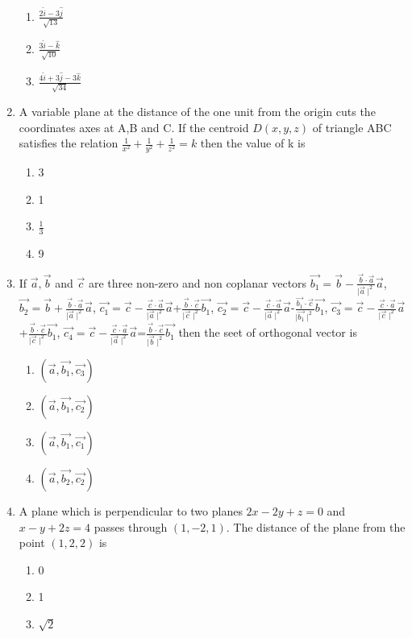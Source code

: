 \documentclass[12pt]{article}
\providecommand{\brak}[1]{\ensuremath{\left(#1\right)}}
\begin{document}
\begin{enumerate}
\begin{enumerate}
\item $\frac{2\hat{i}-3\hat{j}}{\sqrt{13}}$
\item $\frac{3\hat{i}-\hat{k}}{\sqrt{10}}$
\item $\frac{4\hat{i}+3\hat{j}-3\hat{k}}{\sqrt{34}}$
\end{enumerate}
\item A variable plane at the distance of the one unit from the origin cuts the coordinates axes at A,B and C. If the centroid $D\brak{x,y,z}$ of triangle ABC satisfies the relation $\frac{1}{x^2}+\frac{1}{y^2}+\frac{1}{z^2}=k$ then the value of k is 
\begin{enumerate}
\item 3
\item 1
\item $\frac{1}{3}$
\item 9
\end{enumerate}
\item If $\vec{a},\vec{b}$ and $\vec{c}$ are three non-zero and non coplanar vectors $\vec{b_1}=\vec{b}-\frac{\vec{b}\cdot\vec{a}}{\mid\vec{a}\mid^2} \vec{a}$, $\vec{b_2}=\vec{b}+\frac{\vec{b}\cdot\vec{a}}{\mid\vec{a}\mid^2} \vec{a}$, $\vec{c_1}=\vec{c}-\frac{\vec{c}\cdot\vec{a}}{\mid\vec{a}\mid^2} \vec{a}$+$\frac{\vec{b}\cdot\vec{c}}{\mid\vec{c}\mid^2}\vec{b_1}$, $\vec{c_2}=\vec{c}-\frac{\vec{c}\cdot\vec{a}}{\mid\vec{a}\mid^2}\vec{a}$-$\frac{\vec{b_1}\cdot\vec{c}}{\mid\vec{b_1}\mid^2}\vec{b_1}$, $\vec{c_3}=\vec{c}-\frac{\vec{c}\cdot\vec{a}}{\mid\vec{c}\mid^2} \vec{a}$+$\frac{\vec{b}\cdot\vec{c}}{\mid\vec{c}\mid^2} \vec{b_1}$, $\vec{c_4}=\vec{c}-\frac{\vec{c}\cdot\vec{a}}{\mid\vec{a}\mid^2} \vec{a}$=$\frac{\vec{b}\cdot\vec{c}}{\mid\vec{b}\mid^2} \vec{b_1}$ then the seet of orthogonal vector is
\begin{enumerate}
\item $\brak{\vec{a}, \vec{b_1}, \vec{c_3}}$
\item $\brak{\vec{a}, \vec{b_1}, \vec{c_2}}$
\item $\brak{\vec{a}, \vec{b_1}, \vec{c_1}}$
\item $\brak{\vec{a}, \vec{b_2}, \vec{c_2}}$
\end{enumerate}
\item A plane which is perpendicular to two planes $2x-2y+z=0$ and $x-y+2z=4$ passes through $\brak{1,-2,1}$. The distance of the plane from the point $\brak{1,2,2}$ is\
\begin{enumerate}
\item 0
\item 1
\item $\sqrt{2}$

\end{enumerate}
\end{enumerate}
\end{document}
